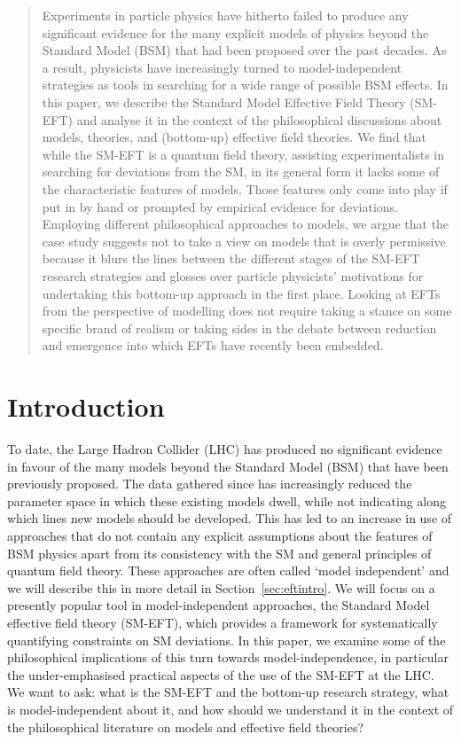 
\begin{abstract}
Experiments in particle physics have hitherto failed to produce any significant evidence for the many explicit models of physics beyond the Standard Model (BSM) that had been proposed over the past decades. 
As a result, physicists have increasingly turned to model-independent strategies as tools in searching for a wide range of possible BSM effects.
In this paper, we describe the Standard Model Effective Field Theory (SM-EFT) and analyse it in the context of the philosophical discussions about models, theories, and (bottom-up) effective field theories.
We find that while the SM-EFT is a quantum field theory, assisting experimentalists in searching for deviations from the SM, in its general form it lacks some of the characteristic features of models. 
Those features only come into play if put in by hand or prompted by empirical evidence for deviations. 
Employing different philosophical approaches to models, we argue that the case study suggests not to take a view on models that is overly permissive because it blurs the lines between the different stages of the SM-EFT research strategies and glosses over particle physicists' motivations for undertaking this bottom-up approach in the first place. 
Looking at EFTs from the perspective of modelling does not require taking a stance on some specific brand of realism or taking sides in the debate between reduction and emergence into which EFTs have recently been embedded.
\end{abstract}

\section{Introduction}

To date, the Large Hadron Collider (LHC) has produced no significant evidence in favour of the many models beyond the Standard Model (BSM) that have been previously proposed. 
The data gathered since has increasingly reduced the parameter space in which these existing models dwell, while not indicating along which lines new models should be developed.
This has led to an increase in use of approaches that do not contain any explicit assumptions about the features of BSM physics apart from its consistency with the SM and general principles of quantum field theory.
These approaches are often called `model independent' and we will describe this in more detail in Section~\ref{sec:eftintro}.
We will focus on a presently popular tool in model-independent approaches, the Standard Model effective field theory (SM-EFT), which provides a framework for systematically quantifying constraints on SM deviations.
In this paper, we examine some of the philosophical implications of this turn towards model-independence, in particular the under-emphasised practical aspects of the use of the SM-EFT at the LHC.
We want to ask: what is the SM-EFT and the bottom-up research strategy, what is model-independent about it, and how should we understand it in the context of the philosophical literature on models and effective field theories?

